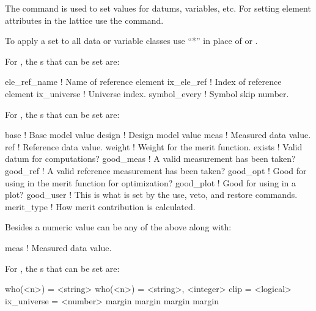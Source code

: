 {\vskip 0.2in 
The  command is used to set values for datums,
variables, etc.  For setting element attributes in the 
lattice use the  command.

To apply a set to all data or variable classes use ``*''
in place of  or .

For , the s that can be set are:
\begin{example}
  ele_ref_name   ! Name of reference element
  ix_ele_ref     ! Index of reference element
  ix_universe    ! Universe index.
  symbol_every   ! Symbol skip number.
\end{example}

For , the s that can be set are:
\begin{example}
  base        ! Base model value
  design      ! Design model value
  meas        ! Measured data value.
  ref         ! Reference data value.
  weight      ! Weight for the merit function.
  exists      ! Valid datum for computations?
  good_meas   ! A valid measurement has been taken?
  good_ref    ! A valid reference measurement has been taken?
  good_opt    ! Good for using in the merit function for optimization?
  good_plot   ! Good for using in a plot?
  good_user   ! This is what is set by the use, veto, and restore commands.
  merit_type  ! How merit contribution is calculated.
\end{example}
Besides a numeric value  can be any of the above along with:
\begin{example}
  meas        ! Measured data value.
\end{example}
\vskip 0.2in

For , the s that can be set are:
\begin{example}
  who(<n>)    = <string>
  who(<n>)    = <string>, <integer>
  clip        = <logical>
  ix_universe = <number>
  margin%
  margin%
  margin%
  margin%
\end{example}
\vskip 0.2in

}
